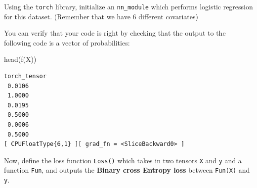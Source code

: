 \documentclass[
  letterpaper,
  DIV=11,
  numbers=noendperiod]{scrartcl}
\newenvironment{Shaded}{\begin{snugshade}}{\end{snugshade}}
\newcommand{\AttributeTok}[1]{\textcolor[rgb]{0.40,0.45,0.13}{#1}}
\newcommand{\CommentTok}[1]{\textcolor[rgb]{0.37,0.37,0.37}{#1}}
\newcommand{\ControlFlowTok}[1]{\textcolor[rgb]{0.00,0.23,0.31}{#1}}
\newcommand{\DecValTok}[1]{\textcolor[rgb]{0.68,0.00,0.00}{#1}}
\newcommand{\FloatTok}[1]{\textcolor[rgb]{0.68,0.00,0.00}{#1}}
\newcommand{\FunctionTok}[1]{\textcolor[rgb]{0.28,0.35,0.67}{#1}}
\newcommand{\NormalTok}[1]{\textcolor[rgb]{0.00,0.23,0.31}{#1}}
\newcommand{\OtherTok}[1]{\textcolor[rgb]{0.00,0.23,0.31}{#1}}
\newcommand{\SpecialCharTok}[1]{\textcolor[rgb]{0.37,0.37,0.37}{#1}}
\begin{document}
Using the \texttt{torch} library, initialize an \texttt{nn\_module}
which performs logistic regression for this dataset. (Remember that we
have 6 different covariates)

\begin{Shaded}
\end{Shaded}

You can verify that your code is right by checking that the output to
the following code is a vector of probabilities:

\begin{Shaded}
\begin{Highlighting}[]
\FunctionTok{head}\NormalTok{(}\FunctionTok{f}\NormalTok{(X))}
\end{Highlighting}
\end{Shaded}

\begin{verbatim}
torch_tensor
 0.0106
 1.0000
 0.0195
 0.5000
 0.0006
 0.5000
[ CPUFloatType{6,1} ][ grad_fn = <SliceBackward0> ]
\end{verbatim}

Now, define the loss function \texttt{Loss()} which takes in two tensors
\texttt{X} and \texttt{y} and a function \texttt{Fun}, and outputs the
\textbf{Binary cross Entropy loss} between \texttt{Fun(X)} and
\texttt{y}.
\end{document}

